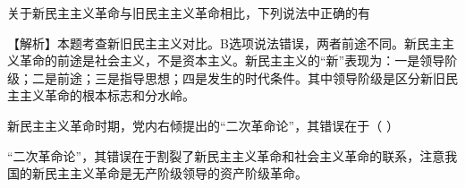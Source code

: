 \question 关于新民主主义革命与旧民主主义革命相比，下列说法中正确的有
\par{}
\begin{solution}【解析】本题考查新旧民主主义对比。B选项说法错误，两者前途不同。新民主主义革命的前途是社会主义，不是资本主义。新民主主义的``新''表现为：一是领导阶级；二是前途；三是指导思想；四是发生的时代条件。其中领导阶级是区分新旧民主主义革命的根本标志和分水岭。
\end{solution}
\question 新民主主义革命时期，党内右倾提出的``二次革命论''，其错误在于（ ）
\par{}
\begin{solution}``二次革命论''，其错误在于割裂了新民主主义革命和社会主义革命的联系，注意我国的新民主主义革命是无产阶级领导的资产阶级革命。
\end{solution}
